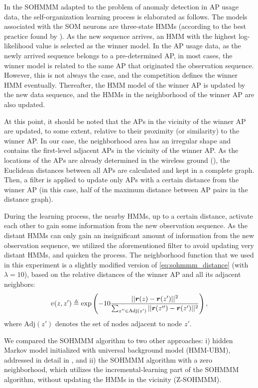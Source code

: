 In the SOHMMM adapted to the problem of anomaly detection in AP usage data, the self-organization learning process is elaborated as follows. The models associated with the SOM neurons are three-state HMMs (according to the best practice found by \citet{Anisa2017,Anisa2019}). As the new sequence arrives, an HMM with the highest log-likelihood value is selected as the winner model. In the AP usage data, as the newly arrived sequence belongs to a pre-determined AP, in most cases, the winner model is related to the same AP that originated the observation sequence. However, this is not always the case, and the competition defines the winner HMM eventually. Thereafter, the HMM model of the winner AP is updated by the new data sequence, and the HMMs in the neighborhood of the winner AP are also updated. 

At this point, it should be noted that the APs in the vicinity of the winner AP are updated, to some extent, relative to their proximity (or similarity) to the winner AP. In our case, the neighborhood area has an irregular shape and contains the first-level adjacent APs in the vicinity of the winner AP. As the locations of the APs are already determined in the wireless ground (), the Euclidean distances between all APs are calculated and kept in a complete graph. Then, a filter is applied to update only APs with a certain distance from the winner AP (in this case, half of the maximum distance between AP pairs in the distance graph). 

During the learning process, the nearby HMMs, up to a certain distance, activate each other to gain some information from the new observation sequence. As the distant HMMs can only gain an insignificant amount of information from the new observation sequence, we utilized the aforementioned filter to avoid updating very distant HMMs, and quicken the process. The neighborhood function that we used in this experiment is a slightly modified version of \eqref{eq:sohmmm_distance} (with $\lambda=10$), based on the relative distances of the winner AP and all its adjacent neighbors: 
\begin{equation}
v(z,z') \triangleq \exp\left(-10 \frac{||{\bm{r}}(z)-{\bm{r}}(z')||^{2}}{\sum_{z'' \in \mathrm{Adj}(z')}||{\bm{r}}(z'')-{\bm{r}}(z')||^{2}}\right),
\label{eq:sohmmm_distance_wifi}
\end{equation}
where $\mathrm{Adj}(z')$ denotes the set of nodes adjacent to node $z'$.

We compared the SOHMMM algorithm to two other approaches: i) hidden Markov model initialized with universal background model (HMM-UBM), addressed in detail in \cite{Anisa2017}, and ii) the SOHMMM algorithm with a zero neighborhood, which utilizes the incremental-learning part of the SOHMMM algorithm, without updating the HMMs in the vicinity (Z-SOHMMM).

